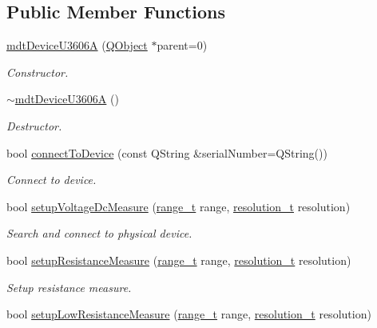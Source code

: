 \subsection*{Public Member Functions}
\begin{DoxyCompactItemize}
\item 
\hyperlink{classmdt_device_u3606_a_a91201ae14df7b553a947b5857eaa1c65}{mdt\-Device\-U3606\-A} (\hyperlink{class_q_object}{Q\-Object} $\ast$parent=0)
\begin{DoxyCompactList}\small\item\em Constructor. \end{DoxyCompactList}\item 
\hyperlink{classmdt_device_u3606_a_a7d2fb26475e72cce95ca6be384d569b7}{$\sim$mdt\-Device\-U3606\-A} ()
\begin{DoxyCompactList}\small\item\em Destructor. \end{DoxyCompactList}\item 
bool \hyperlink{classmdt_device_u3606_a_a8470e8f5f56ab635d2b2718a1bb54034}{connect\-To\-Device} (const Q\-String \&serial\-Number=Q\-String())
\begin{DoxyCompactList}\small\item\em Connect to device. \end{DoxyCompactList}\item 
bool \hyperlink{classmdt_device_u3606_a_a838c4411bdb2de5258d7272cacd5e54a}{setup\-Voltage\-Dc\-Measure} (\hyperlink{classmdt_device_u3606_a_ae05c254d19a66c1728d30100f7c600dc}{range\-\_\-t} range, \hyperlink{classmdt_device_u3606_a_a1899206163f2a0163d09cbc482daf806}{resolution\-\_\-t} resolution)
\begin{DoxyCompactList}\small\item\em Search and connect to physical device. \end{DoxyCompactList}\item 
bool \hyperlink{classmdt_device_u3606_a_aabd0fdf510a8352c418e358676b63818}{setup\-Resistance\-Measure} (\hyperlink{classmdt_device_u3606_a_ae05c254d19a66c1728d30100f7c600dc}{range\-\_\-t} range, \hyperlink{classmdt_device_u3606_a_a1899206163f2a0163d09cbc482daf806}{resolution\-\_\-t} resolution)
\begin{DoxyCompactList}\small\item\em Setup resistance measure. \end{DoxyCompactList}\item 
bool \hyperlink{classmdt_device_u3606_a_ae4da2501de4b809f29cae894a6172c77}{setup\-Low\-Resistance\-Measure} (\hyperlink{classmdt_device_u3606_a_ae05c254d19a66c1728d30100f7c600dc}{range\-\_\-t} range, \hyperlink{classmdt_device_u3606_a_a1899206163f2a0163d09cbc482daf806}{resolution\-\_\-t} resolution)

\end{DoxyCompactItemize}
